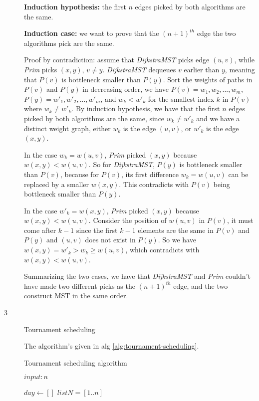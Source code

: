 \documentclass{article}
\begin{document}
\begin{description}
  \textbf{Induction hypothesis:} the first $n$ edges picked by both algorithms are the same. 

  \textbf{Induction case:} we want to prove that the $(n+1)^{th}$ edge the two algorithms pick are the same. 

  Proof by contradiction: assume that \textit{DijkstraMST} picks edge $(u,v)$, while \textit{Prim} picks $(x,y)$, $v \neq y$. \textit{DijkstraMST} dequeues $v$ earlier than $y$, meaning that $P(v)$ is bottleneck smaller than $P(y)$. Sort the weights of paths in $P(v)$ and $P(y)$ in decreasing order, we have $P(v) = {w_1, w_2, ..., w_m}$, $P(y) = {w'_1, w'_2, ..., w'_m}$, and $w_k < w'_k$ for the smallest index $k$ in $P(v)$ where $w_k \neq w'_k$. By induction hypothesis, we have that the first $n$ edges picked by both algorithms are the same, since $w_k \neq w'_k$ and we have a distinct weight graph, either $w_k$ is the edge $(u,v)$, or $w'_k$ is the edge $(x,y)$. 

  In the case $w_k = w(u,v)$, \textit{Prim} picked $(x,y)$ because $w(x,y) < w(u,v)$. So for \textit{DijkstraMST}, $P(y)$ is bottleneck smaller than $P(v)$, because for $P(v)$, its first difference $w_k = w(u,v)$ can be replaced by a smaller $w(x,y)$. This contradicts with $P(v)$ being bottleneck smaller than $P(y)$.

  In the case $w'_k = w(x,y)$, \textit{Prim} picked $(x,y)$ because $w(x,y) < w(u,v)$. Consider the position of $w(u,v)$ in $P(v)$, it must come after $k - 1$ since the first $k - 1$ elements are the same in $P(v)$ and $P(y)$ and $(u,v)$ does not exist in $P(y)$. So we have $w(x,y) = w'_k > w_k \geq w(u,v)$, which contradicts with $w(x,y) < w(u,v)$.

  Summarizing the two cases, we have that \textit{DijkstraMST} and \textit{Prim} couldn't have made two different picks as the $(n+1)^{th}$ edge, and the two construct MST in the same order.

\item[3]{Tournament scheduling}

  The algorithm's given in alg \ref{alg:tournament-scheduling}.
  
  \begin{algorithm}[H]
  \caption{Tournament scheduling algorithm}
  \label{alg:tournament-scheduling}
    \begin{algorithmic}[1]

    \State $input: n$

    \State $day \gets []$
    \State $listN=[1..n]$


\end{algorithmic}
\end{algorithm}
\end{description}
\end{document}
